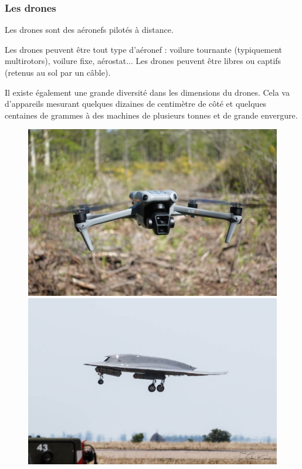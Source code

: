 \subsubsection{Les drones}
Les drones sont des aéronefs pilotés à distance. 

Les drones peuvent être tout type d'aéronef : voilure tournante (typiquement multirotors), voilure fixe, aérostat... Les drones peuvent être libres ou captifs (retenus au sol par un câble).

Il existe également une grande diversité dans les dimensions du drones. Cela va d'appareils mesurant quelques dizaines de centimètre de côté et quelques centaines de grammes à des machines de plusieurs tonnes et de grande envergure.

		\begin{center}
		\begin{minipage}[c]{1.0\linewidth}
		\begin{figure}[H]
		\begin{minipage}[c]{0.5\linewidth}
		\centering
		\includegraphics[width=0.95\linewidth]{01-EtudeAeronefs/img/DJI-Air3.jpg}
		\end{minipage}
		\begin{minipage}[c]{0.5\linewidth}
		\centering
		\includegraphics[width=0.95\linewidth]{01-EtudeAeronefs/img/nEUROn.jpg}

\end{minipage}
\end{figure}
\end{minipage}
\end{center}
